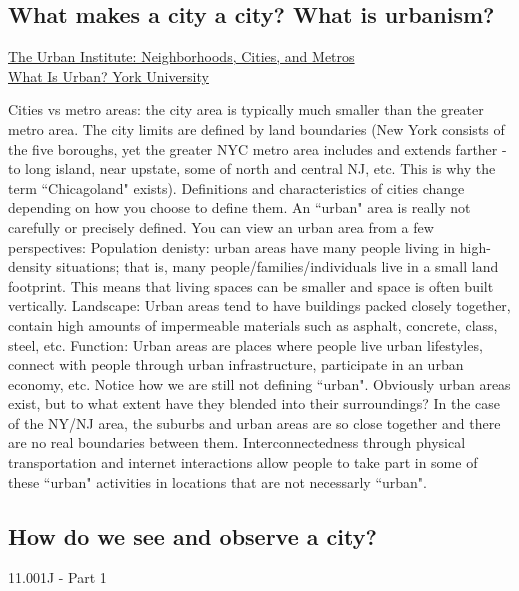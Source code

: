 \documentclass{article}
\begin{document}
        \subsection{What makes a city a city? What is urbanism?}
        \small{\href{https://www.urban.org/urban-wire/what-defines-city}{The Urban Institute: Neighborhoods, Cities, and Metros}}\\
        \small{\href{https://www.yorku.ca/anderson/Intro%20Urban%20Studies/Unit1/what_is_urban.htm}{What Is Urban? York University}}
        \normalsize
        \begin{outline}
            \1 Cities vs metro areas: the city area is typically much smaller than the greater metro area. The city limits are defined by land boundaries (New York consists of the five boroughs, yet the greater NYC metro area includes and extends farther - to long island, near upstate, some of north and central NJ, etc. This is why the term ``Chicagoland" exists). 
            \1 Definitions and characteristics of cities change depending on how you choose to define them. 
            \1 An ``urban" area is really not carefully or precisely defined. You can view an urban area from a few perspectives:
                \2 Population denisty: urban areas have many people living in high-density situations; that is, many people/families/individuals live in a small land footprint. This means that living spaces can be smaller and space is often built vertically. 
                \2 Landscape: Urban areas tend to have buildings packed closely together, contain high amounts of impermeable materials such as asphalt, concrete, class, steel, etc. 
                \2 Function: Urban areas are places where people live urban lifestyles, connect with people through urban infrastructure, participate in an urban economy, etc. Notice how we are still not defining ``urban". 
            \1 Obviously urban areas exist, but to what extent have they blended into their surroundings? In the case of the NY/NJ area, the suburbs and urban areas are so close together and there are no real boundaries between them. Interconnectedness through physical transportation and internet interactions allow people to take part in some of these ``urban" activities in locations that are not necessarly ``urban". 
        \end{outline}
        \subsection{How do we see and observe a city?}
        \small 11.001J - Part 1
        \normalsize 
        \begin{outline}
            \1 
        \end{outline}
\end{document}
